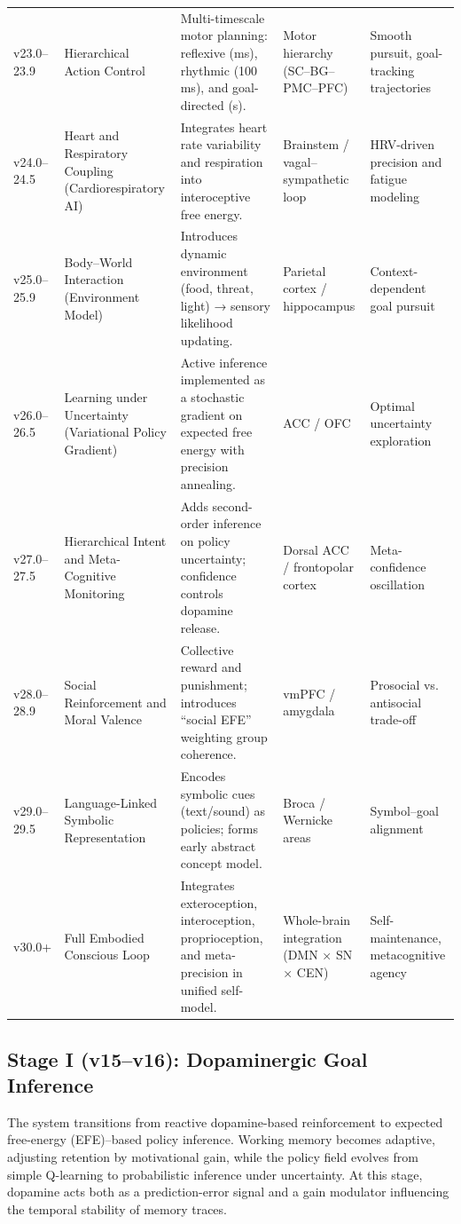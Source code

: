 \documentclass[9pt]{elife}
\begin{document}
\begin{table}[h!]
\begin{tabular}{p{1.8cm} p{3.5cm} p{6.5cm} p{3.5cm} p{3.5cm}}
v23.0–23.9 & Hierarchical Action Control & Multi-timescale motor planning: reflexive (ms), rhythmic (100 ms), and goal-directed (s). & Motor hierarchy (SC–BG–PMC–PFC) & Smooth pursuit, goal-tracking trajectories \\
v24.0–24.5 & Heart and Respiratory Coupling (Cardiorespiratory AI) & Integrates heart rate variability and respiration into interoceptive free energy. & Brainstem / vagal–sympathetic loop & HRV-driven precision and fatigue modeling \\
v25.0–25.9 & Body–World Interaction (Environment Model) & Introduces dynamic environment (food, threat, light) → sensory likelihood updating. & Parietal cortex / hippocampus & Context-dependent goal pursuit \\
v26.0–26.5 & Learning under Uncertainty (Variational Policy Gradient) & Active inference implemented as a stochastic gradient on expected free energy with precision annealing. & ACC / OFC & Optimal uncertainty exploration \\
v27.0–27.5 & Hierarchical Intent and Meta-Cognitive Monitoring & Adds second-order inference on policy uncertainty; confidence controls dopamine release. & Dorsal ACC / frontopolar cortex & Meta-confidence oscillation \\
v28.0–28.9 & Social Reinforcement and Moral Valence & Collective reward and punishment; introduces “social EFE” weighting group coherence. & vmPFC / amygdala & Prosocial vs. antisocial trade-off \\
v29.0–29.5 & Language-Linked Symbolic Representation & Encodes symbolic cues (text/sound) as policies; forms early abstract concept model. & Broca / Wernicke areas & Symbol–goal alignment \\
v30.0+ & Full Embodied Conscious Loop & Integrates exteroception, interoception, proprioception, and meta-precision in unified self-model. & Whole-brain integration (DMN × SN × CEN) & Self-maintenance, metacognitive agency \\
\hline
\end{tabular}
\end{table}

\subsection{Stage I (v15–v16): Dopaminergic Goal Inference}

The system transitions from reactive dopamine-based reinforcement to expected free-energy (EFE)–based policy inference.  
Working memory becomes adaptive, adjusting retention by motivational gain, while the policy field evolves from simple Q-learning to probabilistic inference under uncertainty.  
At this stage, dopamine acts both as a prediction-error signal and a gain modulator influencing the temporal stability of memory traces.
\end{document}
